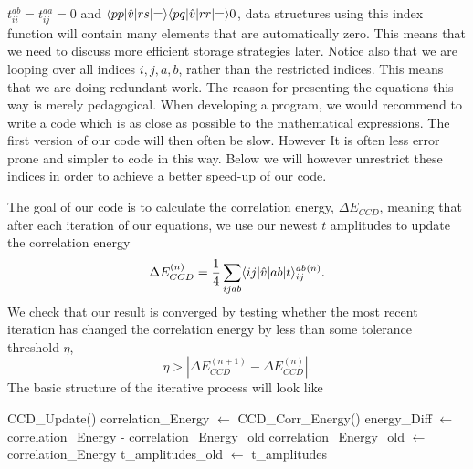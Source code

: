   $t_{ii}^{ab}=t_{ij}^{aa}=0$ and
  $\langle{pp|\hat{v}|rs}|{=}\rangle\langle{pq|\hat{v}|rr}|{=}\rangle0$, data structures
  using this index function will contain many elements that are
  automatically zero. This means that we need to discuss more efficient storage
  strategies later. Notice also that we are looping over all
  indices $i,j,a,b$, rather than the restricted indices. This means that we
  are doing redundant work. The reason for presenting the equations this way is merely pedagogical. When developing a program, we would recommend to write a code which is as close as possible to the mathematical expressions. The first version of our code will then often be slow. However It is  often less error prone and simpler to code in this way. 
Below we will however unrestrict these indices in order to achieve a better speed-up of our code. 

   The goal of our code is to calculate the correlation energy,
   $\Delta E_{CCD}$, meaning that after each iteration of our equations, we use
   our newest $t$ amplitudes to update the correlation energy
  \begin{equation}
  \Delta E_{CCD}^{(n)} = \frac{1}{4} \sum_{ijab}
  \langle{ij|\hat{v}|ab}|{t}\rangle^{ab}_{ij}{}^{(n)}.
  \end{equation}
  We check that our result is converged by testing whether the
  most recent iteration has changed the correlation energy by less
  than some tolerance threshold $\eta$,
  \begin{equation}
  \eta > | \Delta E_{CCD}^{(n+1)} - \Delta E_{CCD}^{(n)} |.
  \end{equation}
  The basic structure of the iterative process will look like
  \begin{algorithmic}
     \State CCD\_Update()
    \State correlation\_Energy $\gets$ CCD\_Corr\_Energy() \State
    energy\_Diff $\gets$ correlation\_Energy -
    correlation\_Energy\_old \State correlation\_Energy\_old $\gets$
    correlation\_Energy \State t\_amplitudes\_old $\gets$
    t\_amplitudes \EndWhile
  \end{algorithmic}

